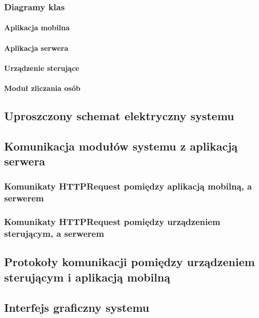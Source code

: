 	\subsubsection{Diagramy klas} 
	
		\paragraph{Aplikacja mobilna}
		\paragraph{Aplikacja serwera}
		\paragraph{Urządzenie sterujące}
		\paragraph{Moduł zliczania osób}
		
\subsection{Uproszczony schemat elektryczny systemu}

\subsection{Komunikacja modułów systemu z aplikacją  serwera}

	\subsubsection{Komunikaty HTTPRequest pomiędzy aplikacją mobilną, \newline a serwerem}
	\subsubsection{Komunikaty HTTPRequest pomiędzy urządzeniem sterującym, a serwerem}
	\newpage
\subsection{Protokoły komunikacji pomiędzy urządzeniem \newline sterującym i aplikacją mobilną}

\subsection{Interfejs graficzny systemu}

